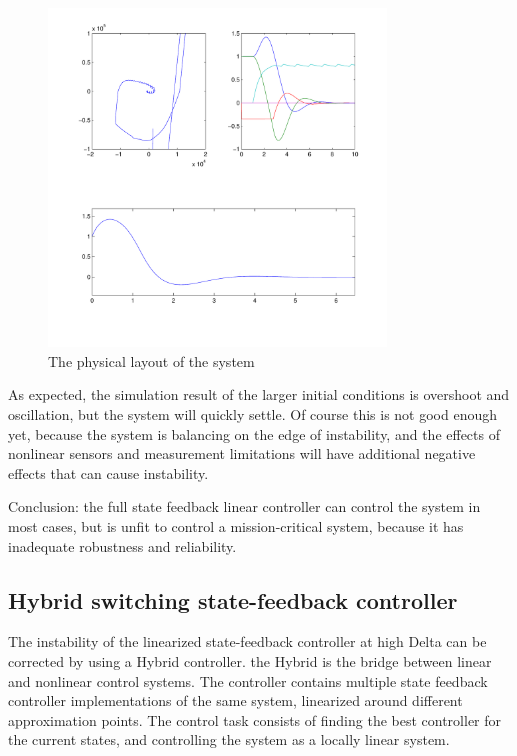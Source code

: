 \begin{figure}[H]
	\centering
	\includegraphics[width=0.8\textwidth]{img2/Lin11}
	\caption{The physical layout of the system}
	\label{fig:PhysicalLayout}
\end{figure}

As expected, the simulation result of the larger initial conditions is overshoot and oscillation, but the system will quickly settle. Of course this is not good enough yet, because the system is balancing on the edge of instability, and the effects of nonlinear sensors and measurement limitations will have additional negative effects that can cause instability.

Conclusion: the full state feedback linear controller can control the system in most cases, but is unfit to control a mission-critical system, because it has inadequate robustness and reliability.

\subsection{Hybrid switching state-feedback controller}
The instability of the linearized state-feedback controller at high Delta can be corrected by using a Hybrid controller.
the Hybrid is the bridge between linear and nonlinear control systems. The controller contains multiple state feedback controller implementations of the same system, linearized around different approximation points. The control task consists of finding the best controller for the current states, and controlling the system as a locally linear system.

